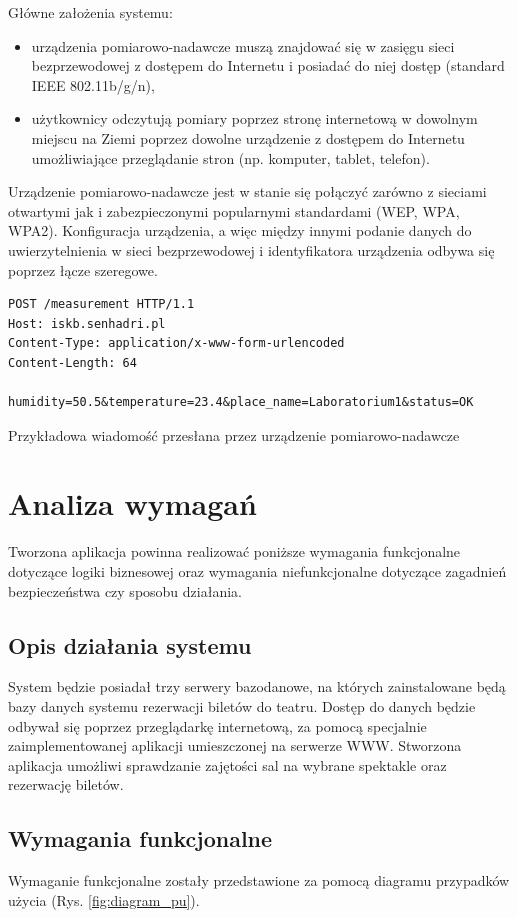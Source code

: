 \documentclass{mgr}
\begin{document}
Główne założenia systemu:
\begin{itemize}
\item urządzenia pomiarowo-nadawcze muszą znajdować się w zasięgu sieci bezprzewodowej z dostępem do Internetu i posiadać do niej dostęp (standard IEEE 802.11b/g/n),
\item użytkownicy odczytują pomiary poprzez stronę internetową w dowolnym miejscu na Ziemi poprzez dowolne urządzenie z dostępem do Internetu umożliwiające przeglądanie stron (np. komputer, tablet, telefon).
\end{itemize}
Urządzenie pomiarowo-nadawcze jest w stanie się połączyć zarówno z sieciami otwartymi jak i zabezpieczonymi popularnymi standardami (WEP, WPA, WPA2). Konfiguracja urządzenia, a więc między innymi podanie danych do uwierzytelnienia w sieci bezprzewodowej i identyfikatora urządzenia odbywa się poprzez łącze szeregowe.
\begin{listing}
\begin{verbatim}
POST /measurement HTTP/1.1
Host: iskb.senhadri.pl
Content-Type: application/x-www-form-urlencoded
Content-Length: 64

humidity=50.5&temperature=23.4&place_name=Laboratorium1&status=OK
\end{verbatim}
\caption{Przykładowa wiadomość przesłana przez urządzenie pomiarowo-nadawcze}
\label{lst:exPOST}
\end{listing}

\chapter{Analiza wymagań}
Tworzona aplikacja powinna realizować poniższe wymagania funkcjonalne dotyczące logiki biznesowej oraz wymagania niefunkcjonalne dotyczące zagadnień bezpieczeństwa czy sposobu działania.

\section{Opis działania systemu}
System będzie posiadał trzy serwery bazodanowe, na których zainstalowane będą bazy danych systemu rezerwacji biletów do teatru. Dostęp do danych będzie odbywał się poprzez przeglądarkę internetową, za pomocą specjalnie zaimplementowanej aplikacji umieszczonej na serwerze WWW. Stworzona aplikacja umożliwi sprawdzanie zajętości sal na wybrane spektakle oraz rezerwację biletów.

\section{Wymagania funkcjonalne}
Wymaganie funkcjonalne zostały przedstawione za pomocą diagramu przypadków użycia (Rys. \ref{fig:diagram_pu}).
\end{document}
